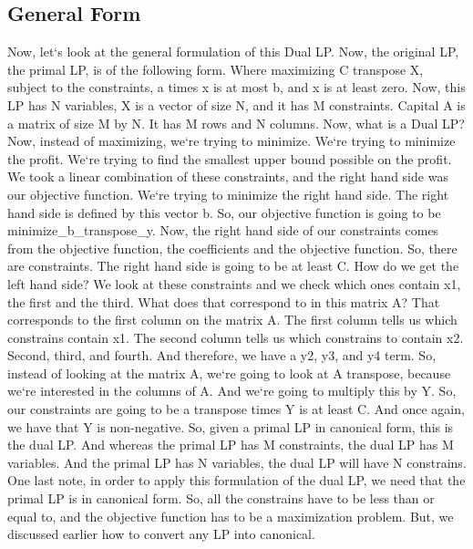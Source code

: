 \subsection{General Form}
Now, let`s look at the general formulation of this Dual LP\@.
Now, the original LP, the primal LP, is of the following form.
Where maximizing C transpose X, subject to the constraints, a times x is at most b, and x is at least zero.
Now, this LP has N variables, X is a vector of size N, and it has M constraints.
Capital A is a matrix of size M by N\@.
It has M rows and N columns.
Now, what is a Dual LP? Now, instead of maximizing, we`re trying to minimize.
We`re trying to minimize the profit.
We`re trying to find the smallest upper bound possible on the profit.
We took a linear combination of these constraints, and the right hand side was our objective function.
We`re trying to minimize the right hand side.
The right hand side is defined by this vector b.
So, our objective function is going to be minimize\_b\_transpose\_y.
Now, the right hand side of our constraints comes from the objective function, the coefficients and the objective function.
So, there are constraints.
The right hand side is going to be at least C\@.
How do we get the left hand side? We look at these constraints and we check which ones contain x1, the first and the third.
What does that correspond to in this matrix A? That corresponds to the first column on the matrix A\@.
The first column tells us which constrains contain x1.
The second column tells us which constrains to contain x2.
Second, third, and fourth.
And therefore, we have a y2, y3, and y4 term.
So, instead of looking at the matrix A, we`re going to look at A transpose, because we`re interested in the columns of A\@.
And we`re going to multiply this by Y\@.
So, our constraints are going to be a transpose times Y is at least C\@.
And once again, we have that Y is non-negative.
So, given a primal LP in canonical form, this is the dual LP\@.
And whereas the primal LP has M constraints, the dual LP has M variables.
And the primal LP has N variables, the dual LP will have N constrains.
One last note, in order to apply this formulation of the dual LP, we need that the primal LP is in canonical form.
So, all the constrains have to be less than or equal to, and the objective function has to be a maximization problem.
But, we discussed earlier how to convert any LP into canonical.

